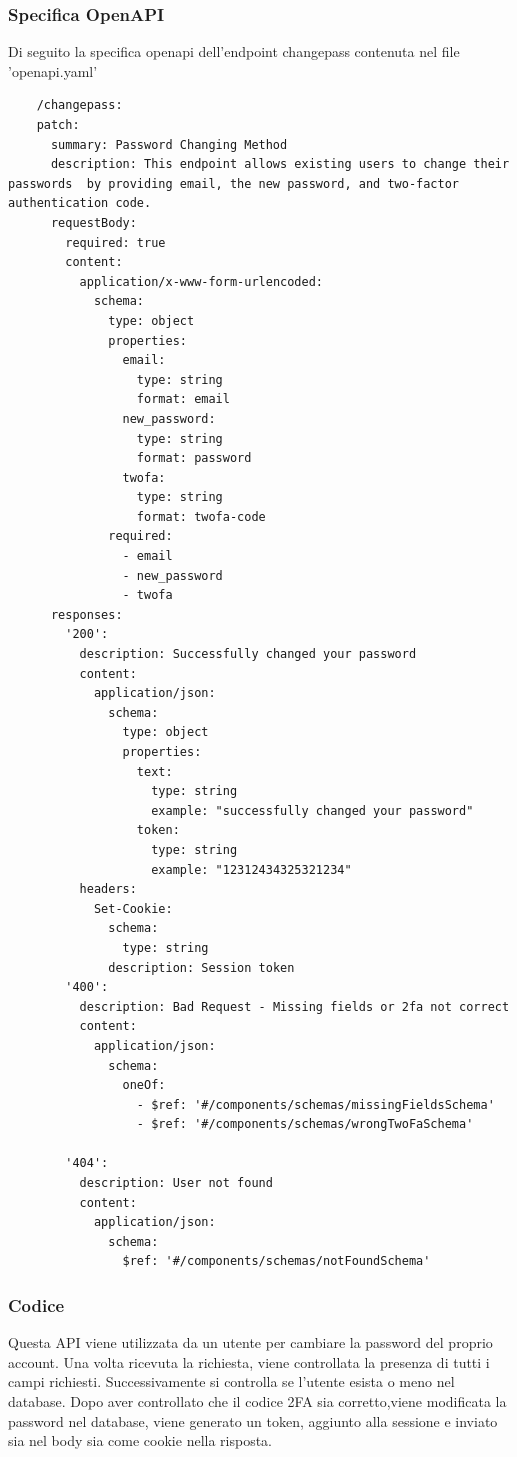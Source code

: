 \documentclass{report}
\begin{document}
\subsubsection*{Specifica OpenAPI}
Di seguito la specifica openapi dell'endpoint changepass contenuta nel file 'openapi.yaml'
\begin{verbatim}
	/changepass:
    patch:
      summary: Password Changing Method
      description: This endpoint allows existing users to change their passwords  by providing email, the new password, and two-factor authentication code.
      requestBody:
        required: true
        content:
          application/x-www-form-urlencoded:
            schema:
              type: object
              properties:
                email:
                  type: string
                  format: email
                new_password:
                  type: string
                  format: password
                twofa:
                  type: string
                  format: twofa-code
              required:
                - email
                - new_password
                - twofa
      responses:
        '200':
          description: Successfully changed your password
          content:
            application/json:
              schema:
                type: object
                properties:
                  text:
                    type: string
                    example: "successfully changed your password"
                  token:
                    type: string
                    example: "12312434325321234"
          headers:
            Set-Cookie:
              schema:
                type: string
              description: Session token
        '400':
          description: Bad Request - Missing fields or 2fa not correct
          content:
            application/json:
              schema:
                oneOf:
                  - $ref: '#/components/schemas/missingFieldsSchema'
                  - $ref: '#/components/schemas/wrongTwoFaSchema'
      
        '404':
          description: User not found
          content:
            application/json:
              schema:
                $ref: '#/components/schemas/notFoundSchema'

\end{verbatim}

\subsubsection*{Codice}
Questa API viene utilizzata da un utente per cambiare la password del proprio account.
Una volta ricevuta la richiesta, viene controllata la presenza di tutti i campi richiesti.
Successivamente si controlla se l'utente esista o meno nel database.
Dopo aver controllato che il codice 2FA sia corretto,viene modificata la password nel database, viene generato un token, aggiunto alla sessione e inviato sia nel body sia come cookie nella risposta.
\end{document}
